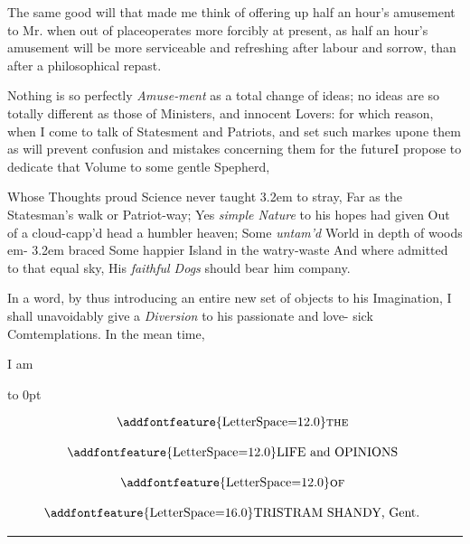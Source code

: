 \documentclass{article}
\begin{document}
The same good will that made me 
think of offering up half an hour’s
amusement to Mr.\@ {} when out of
place\tsk operates more forcibly at\pb
present, as half an hour’s amusement
will be more serviceable and 
refreshing after labour and sorrow,
than after a philosophical repast.

Nothing is so perfectly \textit{Amuse-\break ment}
as a total change of ideas; no
ideas are so totally different as those
of Ministers, and innocent Lovers:
for which reason, when I come to 
talk of Statesment and Patriots, and 
set such markes upone them as will
prevent confusion and mistakes concerning 
them for the future\tsk I propose
to dedicate that Volume to some
gentle Spepherd,

\smallskip
\bgroup\fontsize{9}{12}\selectfont\parindent2pt\parskip0pt\obeylines
Whose Thoughts proud Science never taught
\noindent\kern 3.2em to stray,
Far as the Statesman’s walk or Patriot-way;
Yes \textit{simple Nature} to his hopes had given
Out of a cloud-capp’d head a humbler heaven;
Some \textit{untam’d} World in depth of woods em-
\noindent\kern 3.2em braced\tsk
Some happier Island in the watry-waste\tsk
And where admitted to that equal sky,
His \textit{faithful Dogs} should bear him company.
\egroup

In a word, by thus introducing an
entire new set of objects to his 
Imagination, I shall unavoidably give a\break
\textit{Diversion} to his passionate and love-\break
sick Comtemplations. In the mean\break
time, 

\smallskip

\centerline{I am}

\bigskip 

\egroup


\newpage\null
\setcounter{page}{1}
\pagestyle{folio}
\thispagestyle{empty}
\hbox{}\vskip -36pt
\moveright 88pt\vbox to 0pt{\hsize
40pt\vss}

\[\vbox{\openup 12pt\halign{\hss # \hss\cr
\addfontfeature{LetterSpace=12.0}\textsc{the}\cr
\addfontfeature{LetterSpace=12.0}LIFE and OPINIONS\cr
\addfontfeature{LetterSpace=12.0}\textsc{of}\cr
{\addfontfeature{LetterSpace=16.0}TRISTRAM SHANDY}, Gent.\cr}}\]

\vskip 12pt
\hrule

\bigskip
\sloppy
\setlength{\baselineskip}{14pt}  %
\end{document}
